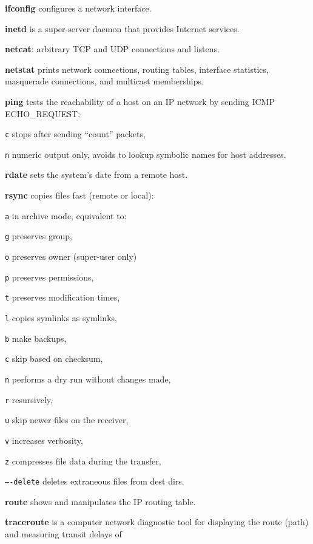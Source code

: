 \begin{enumx}
\item [\cmd] \textbf{ifconfig} configures a network interface.   
\item [\cmd] \textbf{inetd} is a super-server daemon that provides Internet services.
\item [\cmd] \textbf{netcat}: arbitrary TCP and UDP connections and listens.
\item [\cmd] \textbf{netstat} prints network connections, routing tables, 
interface statistics, masquerade connections, and multicast memberships.
\item [\cmd] \textbf{ping} tests the reachability of a host 
on an IP network by sending ICMP ECHO\_REQUEST:
\item [\texttt{c}] stops after sending ``count'' packets,
\item [\texttt{n}] numeric output only, 
	avoids to lookup symbolic names for host addresses. 
\item [\cmd] \textbf{rdate} sets the system's date from a remote host.
\item [\cmd] \textbf{rsync} copies files fast (remote or local):
\item [\texttt{a}] in archive mode, equivalent to:
\item [\texttt{g}] preserves group,
\item [\texttt{o}] preserves owner (super-user only)
\item [\texttt{p}] preserves permissions,
\item [\texttt{t}] preserves modification times,
\item [\texttt{l}] copies symlinks as symlinks,
\item [\texttt{b}] make backups, 
\item [\texttt{c}] skip based on checksum, 
\item [\texttt{n}] performs a dry run without changes made, 
\item [\texttt{r}] resursively, 
\item [\texttt{u}] skip newer files on the receiver, 
\item [\texttt{v}] increases verbosity, 
\item [\texttt{z}] compresses file data during the transfer,
\item [\texttt{}] \texttt{----delete} deletes extraneous files from dest dirs.
\item [\cmd] \textbf{route} shows and manipulates the IP routing table.
\item [\cmd] \textbf{traceroute} is a computer network diagnostic tool for 
displaying the route (path) and measuring transit delays of 
\end{enumx}
